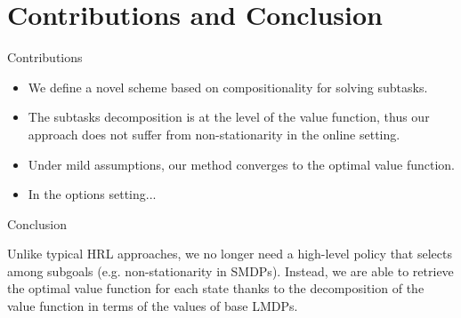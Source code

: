 \documentclass{beamer}
\theoremstyle{mystyle}
\begin{document}
\section{Contributions and Conclusion}
\begin{frame}{Contributions}
\begin{itemize}
    \item We define a novel scheme based on compositionality for solving subtasks. 
    \item The subtasks decomposition is at the level of the value function, thus our approach does not suffer from non-stationarity in the online setting. 
    \item Under mild assumptions, our method converges to the optimal value function.
    \item {\color{myred} In the options setting...}

\end{itemize}

\end{frame}

\begin{frame}{Conclusion}

Unlike typical HRL approaches, we no longer need a high-level policy that selects among subgoals (e.g. non-stationarity in SMDPs). Instead, we are able to retrieve the optimal value function for each state thanks to the decomposition of the value function in terms of the values of base LMDPs.
    
\end{frame}


\begin{frame}[allowframebreaks]{}
    
    
\end{frame}
\end{document}
